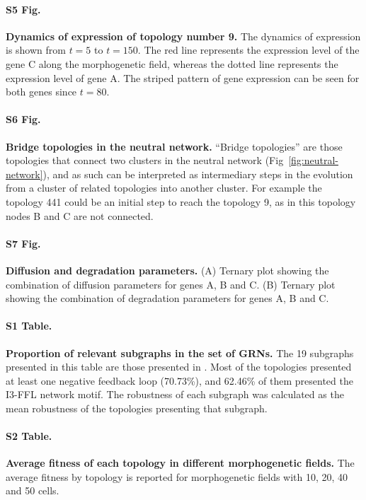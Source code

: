 \documentclass[10pt,letterpaper]{article}
\begin{document}
\paragraph*{S5 Fig.}
\label{S5_Fig}
{\bf Dynamics of expression of topology number 9.}
The dynamics of expression is shown from $t = 5$ to $t = 150$. The red line
represents the expression level of the gene C along the morphogenetic field,
whereas the dotted line represents the expression level of gene A. The
striped pattern of gene expression can be seen for both genes since $t = 80$.

\paragraph*{S6 Fig.}
\label{S6_Fig}
{\bf Bridge topologies in the neutral network.}
``Bridge topologies'' are those topologies that connect two clusters in the neutral
network (Fig~\ref{fig:neutral-network}), and as such can be interpreted as
intermediary steps in the evolution from a cluster of related topologies into
another cluster. For example the topology 441 could be an initial step to reach the
topology 9, as in this topology nodes B and C are not connected.

\paragraph*{S7 Fig.}
\label{S7_Fig}
{\bf Diffusion and degradation parameters.}
(A) Ternary plot showing the combination of diffusion parameters for genes A,
B and C. (B) Ternary plot showing the combination of degradation parameters
for genes A, B and C.

\paragraph*{S1 Table.}
\label{S1_Table}
{\bf Proportion of relevant subgraphs in the set of GRNs.}
The 19 subgraphs presented in this table are those presented in .
Most of the topologies presented at least one negative feedback loop (70.73\%),
and 62.46\% of them presented the I3-FFL network motif. The robustness of each
subgraph was calculated as the mean robustness of the topologies presenting that
subgraph.

\paragraph*{S2 Table.}
\label{S2_Table}
{\bf Average fitness of each topology in different morphogenetic fields.}
The average fitness by topology is reported for morphogenetic fields with 10, 20,
40 and 50 cells.
\end{document}
